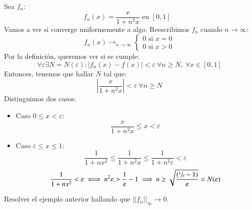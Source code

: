 \begin{eg}
    Sea $f_n$:
    $$
        f_n(x) = \frac{x}{1+n^2x} \text{ en $[0,1]$ }
    $$
    Vamos a ver si converge uniformemente a algo.
    Reescribimos $f_n$ cuando $n \to \infty$:
    $$
        f_n(x) \to_{n \to \infty}
        \begin{cases}
            0 \text{ si } x = 0\\
            0 \text{ si } x > 0
        \end{cases}
    $$
    Por la definición, queremos ver si se cumple:
    $$
        \forall \varepsilon \exists N=N(\varepsilon) : |f_n(x) - f(x)| < \varepsilon\ \forall n \geq N,\ \forall x \in [0,1]
    $$
    Entonces, tenemos que hallar $N$ tal que:
    $$
        \left|  \frac{x}{1+n^2x} \right| < \varepsilon\ \forall n \geq N
    $$
    Distinguimos dos casos:
    \begin{itemize}
        \item Caso $0 \leq x < \varepsilon$:
        $$
            \frac{x}{1+n^2x} \leq x < \varepsilon
        $$
        \item Caso $\varepsilon \leq x \leq 1$:
        $$
            \frac{1}{1+nx^2} \leq \frac{1}{1+n^2x} \leq \frac{1}{1+n^2\varepsilon} < \varepsilon
        $$
        $$
            \frac{1}{1+nx^2} < \varepsilon \iff n^2\varepsilon > \frac{1}{\varepsilon} - 1 \implies n \geq \sqrt{\frac{(\sfrac{1}{\varepsilon} - 1)}{\varepsilon}} = N(\varepsilon)
        $$
    \end{itemize}
\end{eg}

\begin{th_ex}
    Resolver el ejemplo anterior hallando que $||f_n||_\infty \to 0$.
\end{th_ex}

